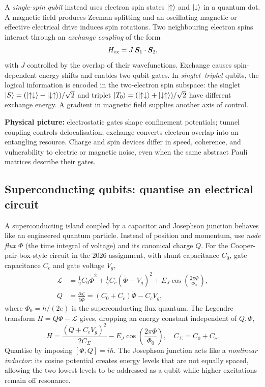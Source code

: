 A \emph{single-spin qubit} instead uses electron spin states $\left\lvert \uparrow\right\rangle$ and $\left\lvert \downarrow\right\rangle$ in a quantum dot. A magnetic field produces Zeeman splitting and an oscillating magnetic or effective electrical drive induces spin rotations. Two neighbouring electron spins interact through an \emph{exchange coupling} of the form
\begin{equation}\label{eq:exchange}
H_{\rm ex}=J\,\bm S_1\cdot\bm S_2,
\end{equation}
with $J$ controlled by the overlap of their wavefunctions. Exchange causes spin-dependent energy shifts and enables two-qubit gates. In \emph{singlet--triplet} qubits, the logical information is encoded in the two-electron spin subspace: the singlet $\left\lvert S\right\rangle=(\left\lvert \uparrow\downarrow\right\rangle-\left\lvert \downarrow\uparrow\right\rangle)/\sqrt2$ and triplet $\left\lvert T_0\right\rangle=(\left\lvert \uparrow\downarrow\right\rangle+\left\lvert \downarrow\uparrow\right\rangle)/\sqrt2$ have different exchange energy. A gradient in magnetic field supplies another axis of control.

\textbf{Physical picture:} electrostatic gates shape confinement potentials; tunnel coupling controls delocalisation; exchange converts electron overlap into an entangling resource. Charge and spin devices differ in speed, coherence, and vulnerability to electric or magnetic noise, even when the same abstract Pauli matrices describe their gates.

\subsection{Superconducting qubits: quantise an electrical circuit}
A superconducting island coupled by a capacitor and Josephson junction behaves like an engineered quantum particle. Instead of position and momentum, use \emph{node flux} $\Phi$ (the time integral of voltage) and its canonical charge $Q$. For the Cooper-pair-box-style circuit in the 2026 assignment, with shunt capacitance $C_0$, gate capacitance $C_c$ and gate voltage $V_g$,
\begin{align}\label{eq:cpblagrangian}
\mathcal L&=\tfrac12C_0\dot\Phi^2+\tfrac12C_c(\dot\Phi-V_g)^2
+E_J\cos\!\left(\frac{2\pi\Phi}{\Phi_0}\right),\\
Q&=\frac{\partial\mathcal L}{\partial\dot\Phi}
=(C_0+C_c)\dot\Phi-C_cV_g,
\end{align}
where $\Phi_0=h/(2e)$ is the superconducting flux quantum. The Legendre transform $H=Q\dot\Phi-\mathcal L$ gives, dropping an energy constant independent of $Q,\Phi$,
\begin{equation}\label{eq:cpbham}
\boxed{H=\frac{(Q+C_cV_g)^2}{2C_\Sigma}
-E_J\cos\!\left(\frac{2\pi\Phi}{\Phi_0}\right),\quad C_\Sigma=C_0+C_c.}
\end{equation}
Quantise by imposing $[\Phi,Q]=i\hbar$. The Josephson junction acts like a \emph{nonlinear inductor}: its cosine potential creates energy levels that are not equally spaced, allowing the two lowest levels to be addressed as a qubit while higher excitations remain off resonance.

